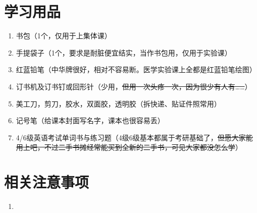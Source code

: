 \section[学习用品]{学习用品}
\begin{enumerate}
    \item 书包（1个，仅用于上集体课）
    \item 手提袋子（1个，要求是耐脏便宜结实，当作书包用，仅用于实验课）
    \item 红蓝铅笔（中华牌很好，相对不容易断。医学实验课上全都是红蓝铅笔绘图）
    \item 订书机及订书钉或回形针（少用，\sout{但用一次头疼一次，因为很少有人有……}）
    \item 美工刀，剪刀，胶水，双面胶，透明胶（拆快递、贴证件照常用）
    \item 记号笔（给课本封面写名字，课本也很容易丢）
    \item 4/6级英语考试单词书与练习题（4级6级基本都属于考研基础了，\sout{但愿大家能用上吧，不过二手书摊经常能买到全新的二手书，可见大家都没怎么学}）
\end{enumerate}

\section[相关注意事项]{相关注意事项}
\begin{enumerate}
    \item 
\end{enumerate}